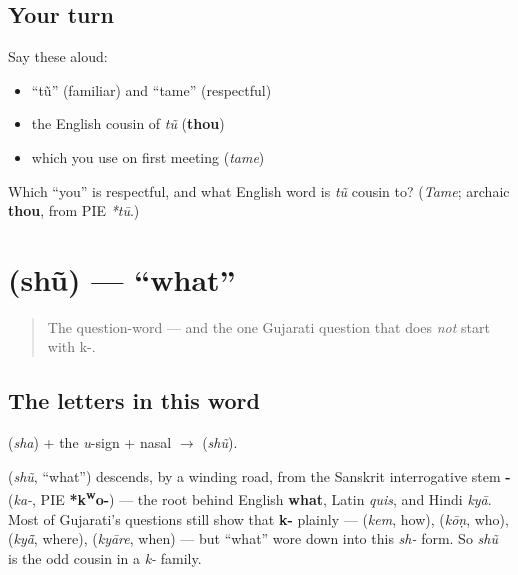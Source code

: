 \subsection*{Your turn}
Say these aloud:

\begin{itemize}
\raggedright
  \item \textquotedblleft{}tũ\textquotedblright{} (familiar) and \textquotedblleft{}tame\textquotedblright{} (respectful)
  \item the English cousin of \emph{tũ} (\textbf{thou})
  \item which you use on first meeting (\emph{tame})
\end{itemize}

\begin{tcolorbox}[breakable,colback=teal!4,colframe=teal!35!black,title={Before you move on}]
Which \textquotedblleft{}you\textquotedblright{} is respectful, and what English word is \emph{tũ} cousin to? (\emph{Tame}; archaic \textbf{thou}, from PIE \emph{*tū}.)
\end{tcolorbox}
\section[\gu{શું}]{ (shũ) — \textquotedblleft{}what\textquotedblright{}}

\label{lesson:GU-C02-shun}



\begin{quote}
The question-word — and the one Gujarati question that does \emph{not} start with k-.
\end{quote}

\subsection*{The letters in this word}
\textbf{} (\emph{sha}) + the \emph{u}-sign + nasal $\to$ \textbf{} (\emph{shũ}).

\begin{cousinweb}
\textbf{} (\emph{shũ}, \textquotedblleft{}what\textquotedblright{}) descends, by a winding road, from the Sanskrit interrogative stem \textbf{-} (\emph{ka-}, PIE \textbf{*k\textsuperscript{w}o-}) — the root behind English \textbf{what}, Latin \emph{quis}, and Hindi \emph{kyā}. Most of Gujarati's questions still show that \textbf{k-} plainly — \textbf{} (\emph{kem}, how), \textbf{} (\emph{kōṇ}, who), \textbf{} (\emph{kyā̃}, where), \textbf{} (\emph{kyāre}, when) — but \textquotedblleft{}what\textquotedblright{} wore down into this \emph{sh-} form. So \emph{shũ} is the odd cousin in a \emph{k-} family.
\end{cousinweb}

